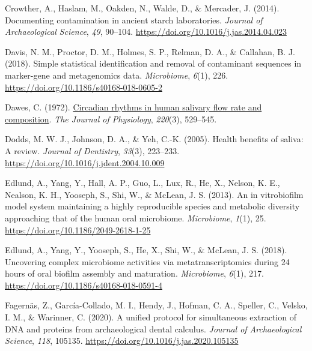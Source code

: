 \documentclass[
  b5paper,
]{book}
\newlength{\cslhangindent}
\newlength{\cslentryspacingunit} %
\newenvironment{CSLReferences}[2] %
 {%
  \setlength{\parindent}{0pt}
  \ifodd #1
  \let\oldpar\par
  \def\par{\hangindent=\cslhangindent\oldpar}
  \fi
  \setlength{\parskip}{#2\cslentryspacingunit}
 }%
 {}
\begin{document}
\begin{CSLReferences}{1}{0}
\leavevmode{}%
Crowther, A., Haslam, M., Oakden, N., Walde, D., \& Mercader, J. (2014).
Documenting contamination in ancient starch laboratories. \emph{Journal
of Archaeological Science}, \emph{49}, 90--104.
\url{https://doi.org/10.1016/j.jas.2014.04.023}

\leavevmode{}%
Davis, N. M., Proctor, D. M., Holmes, S. P., Relman, D. A., \& Callahan,
B. J. (2018). Simple statistical identification and removal of
contaminant sequences in marker-gene and metagenomics data.
\emph{Microbiome}, \emph{6}(1), 226.
\url{https://doi.org/10.1186/s40168-018-0605-2}

\leavevmode{}%
Dawes, C. (1972).
\href{https://www.ncbi.nlm.nih.gov/pmc/articles/PMC1331668}{Circadian
rhythms in human salivary flow rate and composition}. \emph{The Journal
of Physiology}, \emph{220}(3), 529--545.

\leavevmode{}%
Dodds, M. W. J., Johnson, D. A., \& Yeh, C.-K. (2005). Health benefits
of saliva: A review. \emph{Journal of Dentistry}, \emph{33}(3),
223--233. \url{https://doi.org/10.1016/j.jdent.2004.10.009}

\leavevmode{}%
Edlund, A., Yang, Y., Hall, A. P., Guo, L., Lux, R., He, X., Nelson, K.
E., Nealson, K. H., Yooseph, S., Shi, W., \& McLean, J. S. (2013). An in
vitrobiofilm model system maintaining a highly reproducible species and
metabolic diversity approaching that of the human oral microbiome.
\emph{Microbiome}, \emph{1}(1), 25.
\url{https://doi.org/10.1186/2049-2618-1-25}

\leavevmode{}%
Edlund, A., Yang, Y., Yooseph, S., He, X., Shi, W., \& McLean, J. S.
(2018). Uncovering complex microbiome activities via metatranscriptomics
during 24 hours of oral biofilm assembly and maturation.
\emph{Microbiome}, \emph{6}(1), 217.
\url{https://doi.org/10.1186/s40168-018-0591-4}

\leavevmode{}%
Fagernäs, Z., García-Collado, M. I., Hendy, J., Hofman, C. A., Speller,
C., Velsko, I. M., \& Warinner, C. (2020). A unified protocol for
simultaneous extraction of {DNA} and proteins from archaeological dental
calculus. \emph{Journal of Archaeological Science}, \emph{118}, 105135.
\url{https://doi.org/10.1016/j.jas.2020.105135}


\end{CSLReferences}
\end{document}
